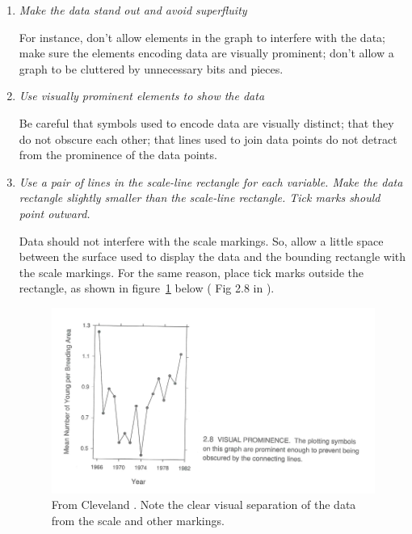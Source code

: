 \begin{enumerate}

\item	\textit{Make the data stand out and avoid superfluity}

For instance, don’t allow elements in the graph to interfere with the data; make sure the elements encoding data are visually prominent; don’t allow a graph to be cluttered by unnecessary bits and pieces.

\item	\textit{Use visually prominent elements to show the data}

Be careful that symbols used to encode data are visually distinct; that they do not obscure each other; that lines used to join data points do not detract from the prominence of the data points.

\item	\textit{Use a pair of lines in the scale-line rectangle for each variable. Make the data rectangle slightly smaller than the scale-line rectangle. Tick marks should point outward.}

Data should not interfere with the scale markings. So, allow a little space between the surface used to display the data and the bounding rectangle with the scale markings. For the same reason, place tick marks outside the rectangle, as shown in figure~\ref{fig:cleveland_promience} below ( Fig 2.8 in \cite{Cleveland} ).

\begin{figure}[ht]
\centering
\includegraphics[scale=1]{pictures/visual_prominence}
\caption{From Cleveland \cite{Cleveland}. Note the clear visual separation of the data from the scale and other markings.}
\label{fig:cleveland_promience}
\end{figure}


\end{enumerate}
